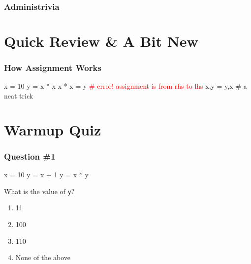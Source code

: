 \documentclass[11pt]{beamer}
\begin{document}
\begin{frame}
  \frametitle{Administrivia}
  \Enlarge
  \begin{itemize}
  \end{itemize}
\end{frame}

\section{Quick Review \& A Bit New}

\begin{frame}[fragile]
  \frametitle{How Assignment Works}
  \Enlarge

  \begin{semiverbatim}
x = 10 \pause
y = x * x \pause
x * x = y \pause  \textcolor{red}{# error! assignment is from rhs to lhs} \pause
x,y = y,x   # a neat trick
\end{semiverbatim}

\end{frame}

\section{Warmup Quiz}


\begin{frame}[fragile]
  \frametitle{Question \#1}
  \Enlarge

  \begin{semiverbatim}
x = 10
y = x + 1
y = x * y
  \end{semiverbatim}
  What is the value of \texttt{y}?
  \begin{enumerate}[label=\Alph*]
  \item  11
  \item  100
  \item  110
  \item  None of the above
  \end{enumerate}
\end{frame}
\end{document}
